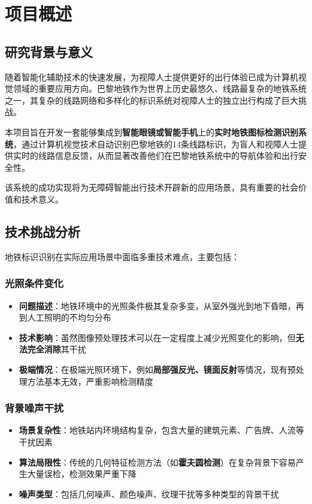 \documentclass[12pt,a4paper]{article}
\begin{document}
\newpage

\section{项目概述}

\subsection{研究背景与意义}

随着智能化辅助技术的快速发展，为视障人士提供更好的出行体验已成为计算机视觉领域的重要应用方向。巴黎地铁作为世界上历史最悠久、线路最复杂的地铁系统之一，其复杂的线路网络和多样化的标识系统对视障人士的独立出行构成了巨大挑战。

本项目旨在开发一套能够集成到\textbf{智能眼镜或智能手机}上的\textbf{实时地铁图标检测识别系统}，通过计算机视觉技术自动识别巴黎地铁的14条线路标识，为盲人和视障人士提供实时的线路信息反馈，从而显著改善他们在巴黎地铁系统中的导航体验和出行安全性。

该系统的成功实现将为无障碍智能出行技术开辟新的应用场景，具有重要的社会价值和技术意义。

\subsection{技术挑战分析}

地铁标识识别在实际应用场景中面临多重技术难点，主要包括：

\subsubsection{光照条件变化}
\begin{itemize}
    \item \textbf{问题描述}：地铁环境中的光照条件极其复杂多变，从室外强光到地下昏暗，再到人工照明的不均匀分布
    \item \textbf{技术影响}：虽然图像预处理技术可以在一定程度上减少光照变化的影响，但\textbf{无法完全消除}其干扰
    \item \textbf{极端情况}：在极端光照环境下，例如\textbf{局部强反光、镜面反射}等情况，现有预处理方法基本无效，严重影响检测精度
\end{itemize}

\subsubsection{背景噪声干扰}
\begin{itemize}
    \item \textbf{场景复杂性}：地铁站内环境结构复杂，包含大量的建筑元素、广告牌、人流等干扰因素
    \item \textbf{算法局限性}：传统的几何特征检测方法（如\textbf{霍夫圆检测}）在复杂背景下容易产生大量误检，检测效果严重下降
    \item \textbf{噪声类型}：包括几何噪声、颜色噪声、纹理干扰等多种类型的背景干扰
\end{itemize}
\end{document}
